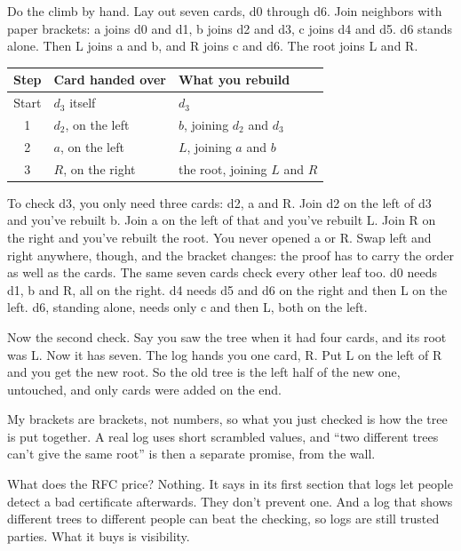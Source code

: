 \documentclass[11pt,twoside]{article}
\theoremstyle{thielethm}
\theoremstyle{thieledef}
\theoremstyle{thieledef}
\theoremstyle{thieledef}
\theoremstyle{thielethm}
\theoremstyle{thieleobs}
\theoremstyle{thielethm}
\begin{document}
Do the climb by hand. Lay out seven cards, d0 through d6. Join neighbors with paper brackets: a joins d0 and d1, b joins d2 and d3, c joins d4 and d5. d6 stands alone. Then L joins a and b, and R joins c and d6. The root joins L and R.

\begin{center}
\small
\begin{tabular}{@{}cll@{}}
Step & Card handed over & What you rebuild \\ \hline
Start & $d_3$ itself & $d_3$ \\
1 & $d_2$, on the left & $b$, joining $d_2$ and $d_3$ \\
2 & $a$, on the left & $L$, joining $a$ and $b$ \\
3 & $R$, on the right & the root, joining $L$ and $R$ \\ \hline
\end{tabular}
\end{center}

To check d3, you only need three cards: d2, a and R. Join d2 on the left of d3 and you've rebuilt b. Join a on the left of that and you've rebuilt L. Join R on the right and you've rebuilt the root. You never opened a or R. Swap left and right anywhere, though, and the bracket changes: the proof has to carry the order as well as the cards. The same seven cards check every other leaf too. d0 needs d1, b and R, all on the right. d4 needs d5 and d6 on the right and then L on the left. d6, standing alone, needs only c and then L, both on the left.

Now the second check. Say you saw the tree when it had four cards, and its root was L. Now it has seven. The log hands you one card, R. Put L on the left of R and you get the new root. So the old tree is the left half of the new one, untouched, and only cards were added on the end.

My brackets are brackets, not numbers, so what you just checked is how the tree is put together. A real log uses short scrambled values, and ``two different trees can't give the same root'' is then a separate promise, from the wall.

What does the RFC price? Nothing. It says in its first section that logs let people detect a bad certificate afterwards. They don't prevent one. And a log that shows different trees to different people can beat the checking, so logs are still trusted parties. What it buys is visibility.
\end{document}
